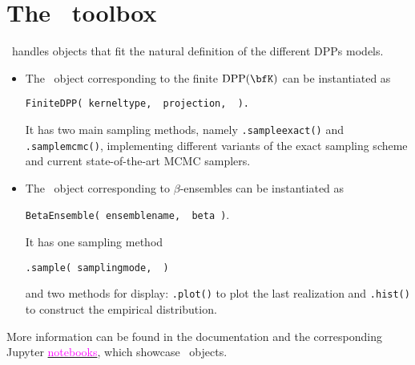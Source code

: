 \section{The \DPPy\ toolbox} %
\label{sec:the_dppy_toolbox}

  \DPPy\ handles objects that fit the natural definition of the different DPPs models.
  \begin{itemize}
	  \item The \DPPy\ object corresponding to the finite $\DPP(\bfK)$ can be instantiated as
    \begin{nscenter}
      \texttt{FiniteDPP(%
        kernel\pyus type\pyeq{},\,%
        projection\pyeq{},\,%
        \pykwargs{}%
        ).}
    \end{nscenter}
		It has two main sampling methods, namely \texttt{.sample\pyus exact()} and \texttt{.sample\pyus mcmc()}, implementing different variants of the exact sampling scheme and current state-of-the-art MCMC samplers.

		\item The \DPPy\ object corresponding to $\beta$-ensembles can be instantiated as
    \begin{nscenter}
      \texttt{BetaEnsemble(%
        ensemble\pyus name\pyeq{},\,%
        beta\pyeq{}%
        )}.
    \end{nscenter}
		It has one sampling method
    \begin{nscenter}
      \texttt{.sample(%
        sampling\pyus mode\pyeq{},\,%
        \pykwargs{}%
        )}
    \end{nscenter}
		and two methods for display: \texttt{.plot()} to plot the last realization and \texttt{.hist()} to construct the empirical distribution.
  \end{itemize}
  More information can be found in the documentation and the corresponding Jupyter \href{https://github.com/guilgautier/DPPy/tree/master/notebooks}{\textcolor{magenta}{notebooks}}, which showcase \DPPy\ objects.

